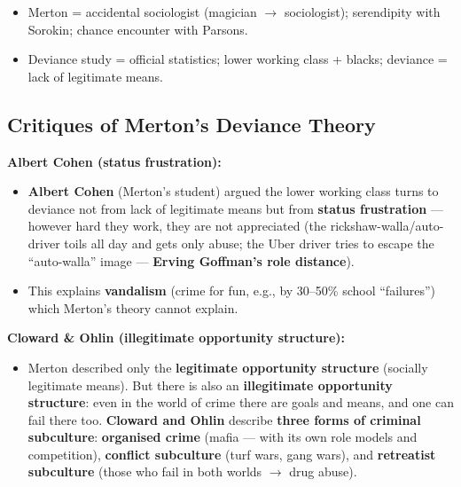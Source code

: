 \begin{QuickRevision}
\begin{itemize}
\item Merton = accidental sociologist (magician $\rightarrow$ sociologist); serendipity with Sorokin; chance encounter with Parsons.
\item Deviance study = official statistics; lower working class + blacks; deviance = lack of legitimate means.
\end{itemize}
\end{QuickRevision}

\sectiondivider

\subsection{Critiques of Merton's Deviance Theory}

\begin{CriticalPoint}
\textbf{Albert Cohen (status frustration):}
\begin{itemize}
\item \textbf{Albert Cohen} (Merton's student) argued the lower working class turns to deviance not from lack of legitimate means but from \textbf{status frustration} --- however hard they work, they are not appreciated (the rickshaw-walla/auto-driver toils all day and gets only abuse; the Uber driver tries to escape the ``auto-walla'' image --- \textbf{Erving Goffman's role distance}).
\item This explains \textbf{vandalism} (crime for fun, e.g., by 30--50\% school ``failures'') which Merton's theory cannot explain.
\end{itemize}
\end{CriticalPoint}

\begin{CriticalPoint}
\textbf{Cloward \& Ohlin (illegitimate opportunity structure):}
\begin{itemize}
\item Merton described only the \textbf{legitimate opportunity structure} (socially legitimate means). But there is also an \textbf{illegitimate opportunity structure}: even in the world of crime there are goals and means, and one can fail there too. \textbf{Cloward and Ohlin} describe \textbf{three forms of criminal subculture}: \textbf{organised crime} (mafia --- with its own role models and competition), \textbf{conflict subculture} (turf wars, gang wars), and \textbf{retreatist subculture} (those who fail in both worlds $\rightarrow$ drug abuse).
\end{itemize}
\end{CriticalPoint}

